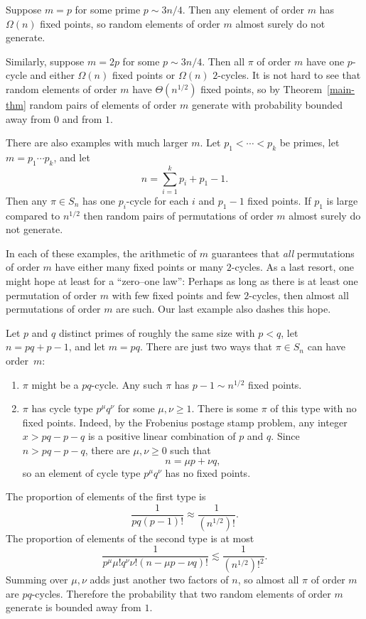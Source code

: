 \documentclass[ALCO,ThmDefs,Unicode,epreuves]{cedram}
\begin{document}
\begin{exam}
 Suppose $m = p$ for some prime $p \sim 3n/4$. Then any element of order $m$ has $\Omega(n)$ fixed points, so random elements of order $m$ almost surely do not generate.
\end{exam}

\begin{exam}
 Similarly, suppose $m = 2p$ for some $p \sim 3n/4$. Then all $\pi$ of order $m$ have one $p$-cycle and either $\Omega(n)$ fixed points or $\Omega(n)$ $2$-cycles. It is not hard to see that random elements of order $m$ have $\Theta(n^{1/2})$ fixed points, so by Theorem~\ref{main-thm} random pairs of elements of order $m$ generate with probability bounded away from $0$ and from $1$.
\end{exam}

\begin{exam}
 There are also examples with much larger $m$. Let $p_1 < \cdots < p_k$ be primes, let $m = p_1 \cdots p_k$, and let
 \[
 n = \sum_{i=1}^k p_i + p_1 - 1.
 \]
 Then any $\pi \in S_n$ has one $p_i$-cycle for each $i$ and $p_1 - 1$ fixed points. If $p_1$ is large compared to $n^{1/2}$ then random pairs of permutations of order $m$ almost surely do not generate.
\end{exam}

In each of these examples, the arithmetic of $m$ guarantees that \emph{all} permutations of order $m$ have either many fixed points or many $2$-cycles. As a last resort, one might hope at least for a ``zero--one law'': Perhaps as long as there is at least one permutation of order $m$ with few fixed points and few $2$-cycles, then almost all permutations of order $m$ are such. Our last example also dashes this hope.

\begin{exam} Let $p$ and $q$ distinct primes of roughly the same size with $p < q$, let $n = pq + p - 1$, and let $m = pq$. There are just two ways that $\pi \in S_n$ can have order~$m$:
 \begin{enumerate}
 \item\label{exam5.5_1} $\pi$ might be a $pq$-cycle. Any such $\pi$ has $p-1 \sim n^{1/2}$ fixed points.
 \item\label{exam5.5_2} $\pi$ has cycle type $p^\mu q^\nu$ for some $\mu, \nu \geq 1$. There is some $\pi$ of this type with no fixed points.
 Indeed, by the Frobenius postage stamp problem, any integer $x > pq - p - q$ is a positive linear combination of $p$ and $q$.
 Since $n > pq - p - q$, there are $\mu,\nu\geq0$ such that
 \[
 n = \mu p + \nu q,
 \]
 so an element of cycle type $p^\mu q^\nu$ has no fixed points.
 \end{enumerate}
 The proportion of elements of the first type is
 \[
 \frac1{p q (p-1)!} \approx \frac1{(n^{1/2})!}.
 \]
 The proportion of elements of the second type is at most
 \[
 \frac1{p^\mu \mu! q^\nu \nu! (n - \mu p - \nu q)!} \lesssim \frac1{(n^{1/2})!^2}.
 \]
 Summing over $\mu, \nu$ adds just another two factors of $n$, so almost all $\pi$ of order $m$ are $pq$-cycles. Therefore the probability that two random elements of order $m$ generate is bounded away from $1$.
\end{exam}
\end{document}
